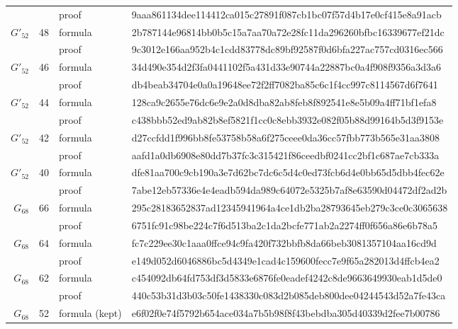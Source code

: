 \documentclass[11pt]{article}
\theoremstyle{definition}
\theoremstyle{remark}
\newcommand{\Gb}{G'_{52}}
\newcommand{\Gsix}{G_{68}}
\begin{document}
\begin{longtable}{@{}rrll@{}}
 & & proof & {\tiny\ttfamily 9aaa861134dee114412ca015c27891f087cb1bc07f57d4b17e0cf415e8a91acb} \\
$\Gb$ & 48 & formula & {\tiny\ttfamily 2b787144e96814bb0b5c15a7aa70a72e28fc11da296260bfbc16339677ef21dc} \\
 & & proof & {\tiny\ttfamily 9c3012e166aa952b4c1cdd83778dc89bf92587f0d6bfa227ac757cd0316ec566} \\
$\Gb$ & 46 & formula & {\tiny\ttfamily 34d490e354d2f3fa0441102f5a431d33e90744a22887bc0a4f908f9356a3d3a6} \\
 & & proof & {\tiny\ttfamily db4beab34704e0a0a19648ee72f2ff7082ba85c6c1f4cc997c8114567d6f7641} \\
$\Gb$ & 44 & formula & {\tiny\ttfamily 128ca9c2655e76dc6e9e2a0d8dba82ab8feb8f892541e8e5b09a4ff71bf1efa8} \\
 & & proof & {\tiny\ttfamily c438bbb52ed9ab82b8ef5821f1cc0c8ebb3932e082f05b88d99164b5d3f9153e} \\
$\Gb$ & 42 & formula & {\tiny\ttfamily d27ccfdd1f996bb8fe53758b58a6f275ceee0da36cc57fbb773b565e31aa3808} \\
 & & proof & {\tiny\ttfamily aafd1a0db6908e80dd7b37fc3c315421f86ceedbf0241cc2bf1c687ae7cb333a} \\
$\Gb$ & 40 & formula & {\tiny\ttfamily dfe81aa700c9cb190a3e7d62bc7dc6c5d4c0ed73fcb6d4e0bb65d5dbb4fec62e} \\
 & & proof & {\tiny\ttfamily 7abe12eb57336e4e4eadb594da989c64072e5325b7af8e63590d04472df2ad2b} \\
$\Gsix$ & 66 & formula & {\tiny\ttfamily 295c28183652837ad12345941964a4ce1db2ba28793645eb279c3ce0c3065638} \\
 & & proof & {\tiny\ttfamily 6751fc91c98be224c7f6d513ba2c1da2bcfe771ab2a2274ff0f656a86e6b78a5} \\
$\Gsix$ & 64 & formula & {\tiny\ttfamily fc7c229ee30c1aaa0ffce94c9fa420f732bbfb8da66beb3081357104aa16cd9d} \\
 & & proof & {\tiny\ttfamily e149d052d6046886bc5d4349e1cad4c159600fecc7e9f65a282013d4ffcb4ea2} \\
$\Gsix$ & 62 & formula & {\tiny\ttfamily c454092db64fd753df3d5833e6876fe0eadef4242c8de9663649930eab1d5de0} \\
 & & proof & {\tiny\ttfamily 440c53b31d3b03c50fe1438330c083d2b085deb800dee04244543d52a7fe43ca} \\
$\Gsix$ & 52 & formula (kept) & {\tiny\ttfamily e6f02f0e74f5792b654ace034a7b5b98f8f43bebdba305d40339d2fee7b00786} \\
\end{longtable}
\end{document}
